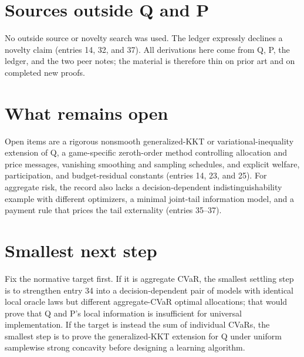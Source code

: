 \documentclass{article}
\begin{document}
\section*{Sources outside Q and P}
No outside source or novelty search was used. The ledger expressly declines a novelty claim (entries 14, 32, and 37). All derivations here come from Q, P, the ledger, and the two peer notes; the material is therefore thin on prior art and on completed new proofs.

\section*{What remains open}
Open items are a rigorous nonsmooth generalized-KKT or variational-inequality extension of Q, a game-specific zeroth-order method controlling allocation and price messages, vanishing smoothing and sampling schedules, and explicit welfare, participation, and budget-residual constants (entries 14, 23, and 25). For aggregate risk, the record also lacks a decision-dependent indistinguishability example with different optimizers, a minimal joint-tail information model, and a payment rule that prices the tail externality (entries 35--37).

\section*{Smallest next step}
Fix the normative target first. If it is aggregate CVaR, the smallest settling step is to strengthen entry 34 into a decision-dependent pair of models with identical local oracle laws but different aggregate-CVaR optimal allocations; that would prove that Q and P's local information is insufficient for universal implementation. If the target is instead the sum of individual CVaRs, the smallest step is to prove the generalized-KKT extension for Q under uniform samplewise strong concavity before designing a learning algorithm.
\end{document}
